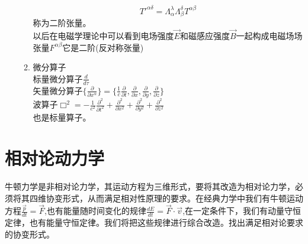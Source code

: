 \begin{enumerate}
\begin{enumerate}
$$T'^{\alpha\delta}=\Lambda^{\lambda}_{\alpha}\Lambda^{\delta}_{\beta}T^{\alpha\beta}$$
称为二阶张量。\\
以后在电磁学理论中可以看到电场强度$\overrightarrow{E}$和磁感应强度$\overrightarrow{B}$一起构成电磁场场张量$F^{\alpha\beta}$它是二阶(反对称张量)\\
\item 微分算子\\
标量微分算子$\frac{d}{d\tau}$\\
矢量微分算子$\{\frac{\partial}{\partial x^{\alpha}}\}=\{\frac{1}{c}\frac{\partial}{\partial t},\frac{\partial}{\partial x},\frac{\partial}{\partial y},\frac{\partial}{\partial z}\}$\\
波算子$\Box^{2}=-\frac{1}{c^{2}}\frac{\partial^{2}}{\partial t^{2}}+\frac{\partial^{2}}{\partial x^{2}}+\frac{\partial^{2}}{\partial y^{2}}+\frac{\partial^{2}}{\partial z^{2}}$\\
也是标量算子。
\end{enumerate}
\end{enumerate}
\section{相对论动力学}
牛顿力学是非相对论力学，其运动方程为三维形式，要将其改造为相对论力学，必须将其四维协变形式，从而满足相对性原理的要求。在经典力学中我们有牛顿运动方程$\frac{\overrightarrow{p}}{dt}=\overrightarrow{F}$,也有能量随时间变化的规律$\frac{dE}{dt}=\overrightarrow{F}\cdot\overrightarrow{v}$,在一定条件下，我们有动量守恒定律，也有能量守恒定律。我们将把这些规律进行综合改造。找出满足相对论要求的协变形式。
